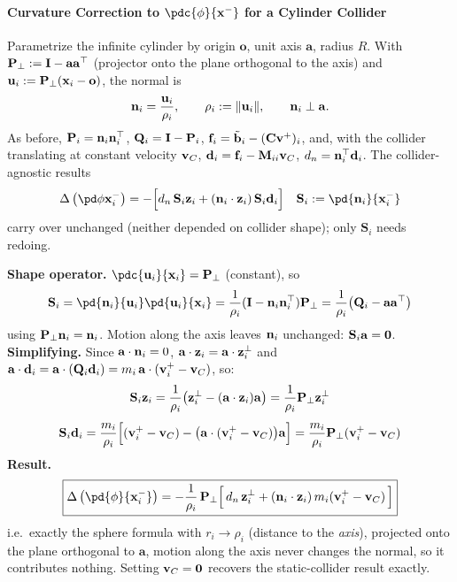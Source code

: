 \begin{derivation}
\paragraph{Curvature Correction to $\pdc{\phi}{\x^-}$ for a Cylinder Collider} \mbox{}\par\medskip

\begin{reminder}
Parametrize the infinite cylinder by origin $\mathbf o$, unit axis $\mathbf a$, radius $R$.
With $\mathbf{P}_\perp := \mathbf{I}-\mathbf a\mathbf a^\top$ (projector onto the plane orthogonal to the axis)
and $\mathbf u_i := \mathbf{P}_\perp(\mathbf{x}_i-\mathbf o)$, the normal is
$$
\mathbf{n}_i = \frac{\mathbf u_i}{\rho_i}, \qquad \rho_i := \|\mathbf u_i\|, \qquad \mathbf{n}_i\perp\mathbf a.
$$
As before, $\mathbf{P}_i=\mathbf{n}_i\mathbf{n}_i^\top$, $\mathbf{Q}_i=\mathbf{I}-\mathbf{P}_i$, $\mathbf{f}_i=\tilde{\mathbf{b}}_i-(\mathbf{C}\mathbf{v}^+)_i$, and,
with the collider translating at constant velocity $\mathbf{v}_C$, $\mathbf{d}_i=\mathbf{f}_i-\mathbf{M}_{ii}\mathbf{v}_C$, $d_n=\mathbf{n}_i^\top\mathbf{d}_i$.
The collider-agnostic results
$$
\Delta\left(\pd\phi{\x_i^-}\right) = -\Big[d_n\,\mathbf S_i\z_i+(\n_i\cdot\z_i)\,\mathbf S_i\dd_i\Big]
\quad \mathbf S_i:=\pd{\n_i}{\x_i^-}
$$
carry over unchanged (neither depended on collider shape); only $\mathbf S_i$ needs redoing.
\end{reminder}
\textbf{Shape operator.} $\pdc{\mathbf u_i}{\x_i}=\mathbf{P}_\perp$ (constant), so
$$
\mathbf S_i = \pd{\n_i}{\mathbf u_i}\pd{\mathbf u_i}{\x_i} = \frac1{\rho_i}(\I-\n_i\n_i^\top)\mathbf{P}_\perp
= \frac1{\rho_i}\big(\mathbf{Q}_i-\mathbf a\mathbf a^\top\big)
$$
using $\mathbf{P}_\perp\mathbf{n}_i=\mathbf{n}_i$. Motion along the axis leaves $\mathbf{n}_i$ unchanged: $\mathbf S_i\mathbf a=\mathbf{0}$.
\newline\textbf{Simplifying.} Since $\mathbf a\cdot\mathbf{n}_i=0$, $\mathbf a\cdot\mathbf{z}_i=\mathbf a\cdot\mathbf{z}_i^\perp$ and
$\mathbf a\cdot\mathbf{d}_i=\mathbf a\cdot(\mathbf{Q}_i\mathbf{d}_i)=m_i\,\mathbf a\cdot(\mathbf{v}_i^+-\mathbf{v}_C)$, so:
\begin{gather*}
\mathbf S_i\mathbf{z}_i = \frac1{\rho_i}\big(\mathbf{z}_i^\perp-(\mathbf a\cdot\mathbf{z}_i)\mathbf a\big)=\frac1{\rho_i}\mathbf{P}_\perp\mathbf{z}_i^\perp
\\[1ex]
\mathbf S_i\mathbf{d}_i = \frac{m_i}{\rho_i}\Big[(\mathbf{v}_i^+-\mathbf{v}_C)-\big(\mathbf a\cdot(\mathbf{v}_i^+-\mathbf{v}_C)\big)\mathbf a\Big]=\frac{m_i}{\rho_i}\mathbf{P}_\perp(\mathbf{v}_i^+-\mathbf{v}_C)
\end{gather*}
\newline \textbf{Result.}
\begin{equation}
    \boxed{
    \Delta\left(\pd{\phi}{\x_i^-}\right) = -\frac1{\rho_i}\,\mathbf{P}_\perp\Big[\,d_n\,\z_i^\perp+(\n_i\cdot\z_i)\,m_i(\vv_i^+-\vv_C)\,\Big]
    }
\end{equation}
i.e.\ exactly the sphere formula with $r_i\to\rho_i$ (distance to the \emph{axis}), projected onto the plane orthogonal to $\mathbf a$, motion along the axis never changes the normal, so it contributes nothing. Setting $\mathbf{v}_C=\mathbf{0}$ recovers the static-collider result exactly.
\end{derivation}

